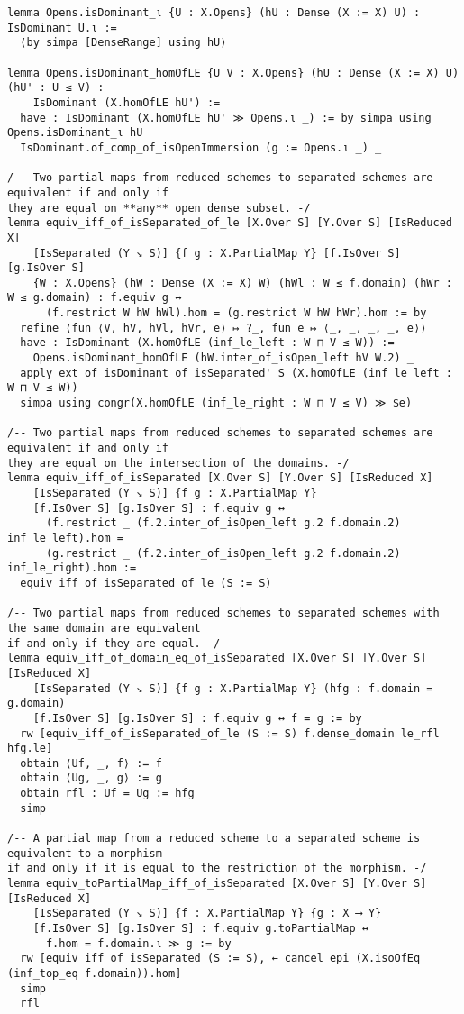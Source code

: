 \documentclass{article}
\begin{document}
\begin{lstlisting}[language=Lean, caption={RationalMap.lean}]
lemma Opens.isDominant_ι {U : X.Opens} (hU : Dense (X := X) U) : IsDominant U.ι :=
  ⟨by simpa [DenseRange] using hU⟩

lemma Opens.isDominant_homOfLE {U V : X.Opens} (hU : Dense (X := X) U) (hU' : U ≤ V) :
    IsDominant (X.homOfLE hU') :=
  have : IsDominant (X.homOfLE hU' ≫ Opens.ι _) := by simpa using Opens.isDominant_ι hU
  IsDominant.of_comp_of_isOpenImmersion (g := Opens.ι _) _

/-- Two partial maps from reduced schemes to separated schemes are equivalent if and only if
they are equal on **any** open dense subset. -/
lemma equiv_iff_of_isSeparated_of_le [X.Over S] [Y.Over S] [IsReduced X]
    [IsSeparated (Y ↘ S)] {f g : X.PartialMap Y} [f.IsOver S] [g.IsOver S]
    {W : X.Opens} (hW : Dense (X := X) W) (hWl : W ≤ f.domain) (hWr : W ≤ g.domain) : f.equiv g ↔
      (f.restrict W hW hWl).hom = (g.restrict W hW hWr).hom := by
  refine ⟨fun ⟨V, hV, hVl, hVr, e⟩ ↦ ?_, fun e ↦ ⟨_, _, _, _, e⟩⟩
  have : IsDominant (X.homOfLE (inf_le_left : W ⊓ V ≤ W)) :=
    Opens.isDominant_homOfLE (hW.inter_of_isOpen_left hV W.2) _
  apply ext_of_isDominant_of_isSeparated' S (X.homOfLE (inf_le_left : W ⊓ V ≤ W))
  simpa using congr(X.homOfLE (inf_le_right : W ⊓ V ≤ V) ≫ $e)

/-- Two partial maps from reduced schemes to separated schemes are equivalent if and only if
they are equal on the intersection of the domains. -/
lemma equiv_iff_of_isSeparated [X.Over S] [Y.Over S] [IsReduced X]
    [IsSeparated (Y ↘ S)] {f g : X.PartialMap Y}
    [f.IsOver S] [g.IsOver S] : f.equiv g ↔
      (f.restrict _ (f.2.inter_of_isOpen_left g.2 f.domain.2) inf_le_left).hom =
      (g.restrict _ (f.2.inter_of_isOpen_left g.2 f.domain.2) inf_le_right).hom :=
  equiv_iff_of_isSeparated_of_le (S := S) _ _ _

/-- Two partial maps from reduced schemes to separated schemes with the same domain are equivalent
if and only if they are equal. -/
lemma equiv_iff_of_domain_eq_of_isSeparated [X.Over S] [Y.Over S] [IsReduced X]
    [IsSeparated (Y ↘ S)] {f g : X.PartialMap Y} (hfg : f.domain = g.domain)
    [f.IsOver S] [g.IsOver S] : f.equiv g ↔ f = g := by
  rw [equiv_iff_of_isSeparated_of_le (S := S) f.dense_domain le_rfl hfg.le]
  obtain ⟨Uf, _, f⟩ := f
  obtain ⟨Ug, _, g⟩ := g
  obtain rfl : Uf = Ug := hfg
  simp

/-- A partial map from a reduced scheme to a separated scheme is equivalent to a morphism
if and only if it is equal to the restriction of the morphism. -/
lemma equiv_toPartialMap_iff_of_isSeparated [X.Over S] [Y.Over S] [IsReduced X]
    [IsSeparated (Y ↘ S)] {f : X.PartialMap Y} {g : X ⟶ Y}
    [f.IsOver S] [g.IsOver S] : f.equiv g.toPartialMap ↔
      f.hom = f.domain.ι ≫ g := by
  rw [equiv_iff_of_isSeparated (S := S), ← cancel_epi (X.isoOfEq (inf_top_eq f.domain)).hom]
  simp
  rfl


\end{lstlisting}
\end{document}
